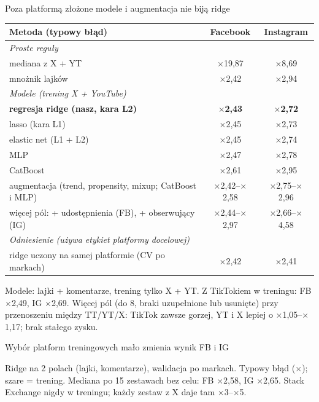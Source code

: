 \documentclass[aspectratio=169,10pt]{beamer}
\renewcommand{\x}[1]{$\times$#1}
\begin{document}
\begin{frame}{Poza platformą złożone modele i augmentacja nie biją ridge}
\centering\scriptsize\setlength{\tabcolsep}{6pt}\renewcommand{\arraystretch}{0.85}
\begin{tabular}{lcc}
\toprule
Metoda (typowy błąd) & Facebook & Instagram \\
\midrule
\multicolumn{3}{l}{\textit{Proste reguły}} \\
\quad mediana z X + YT & \x{19,87} & \x{8,69} \\
\quad mnożnik lajków & \x{2,42} & \x{2,94} \\
\midrule
\multicolumn{3}{l}{\textit{Modele (trening X + YouTube)}} \\
\quad \textbf{regresja ridge (nasz, kara L2)} & \textbf{\x{2,43}} & \textbf{\x{2,72}} \\
\quad lasso (kara L1) & \x{2,45} & \x{2,73} \\
\quad elastic net (L1 + L2) & \x{2,45} & \x{2,74} \\
\quad MLP & \x{2,47} & \x{2,78} \\
\quad CatBoost & \x{2,61} & \x{2,95} \\
\quad augmentacja (trend, propensity, mixup; CatBoost i MLP) & \x{2,42}--\x{2,58} & \x{2,75}--\x{2,96} \\
\quad więcej pól: + udostępnienia (FB), + obserwujący (IG) & \x{2,44}--\x{2,97} & \x{2,66}--\x{4,58} \\
\midrule
\multicolumn{3}{l}{\textit{Odniesienie (używa etykiet platformy docelowej)}} \\
\quad ridge uczony na samej platformie (CV po markach) & \x{2,42} & \x{2,41} \\
\bottomrule
\end{tabular}
\vfill
{\scriptsize\color{mut} Modele: lajki + komentarze, trening tylko X + YT. Z TikTokiem w treningu: FB \x{2,49}, IG \x{2,69}. Więcej pól (do 8, braki uzupełnione lub usunięte) przy przenoszeniu między TT/YT/X: TikTok zawsze gorzej, YT i X lepiej o \x{1,05}--\x{1,17}; brak stałego zysku.}
\end{frame}

\begin{frame}{Wybór platform treningowych mało zmienia wynik FB i IG}
\centering\scriptsize\setlength{\tabcolsep}{3pt}\renewcommand{\arraystretch}{0.8}

\vfill
{\scriptsize\color{mut} Ridge na 2 polach (lajki, komentarze), walidacja po markach. Typowy błąd (\x{}); szare = trening. Mediana po 15 zestawach bez celu: FB \x{2,58}, IG \x{2,65}. Stack Exchange nigdy w treningu; każdy zestaw z X daje tam \x{3}--\x{5}.}
\end{frame}
\end{document}
